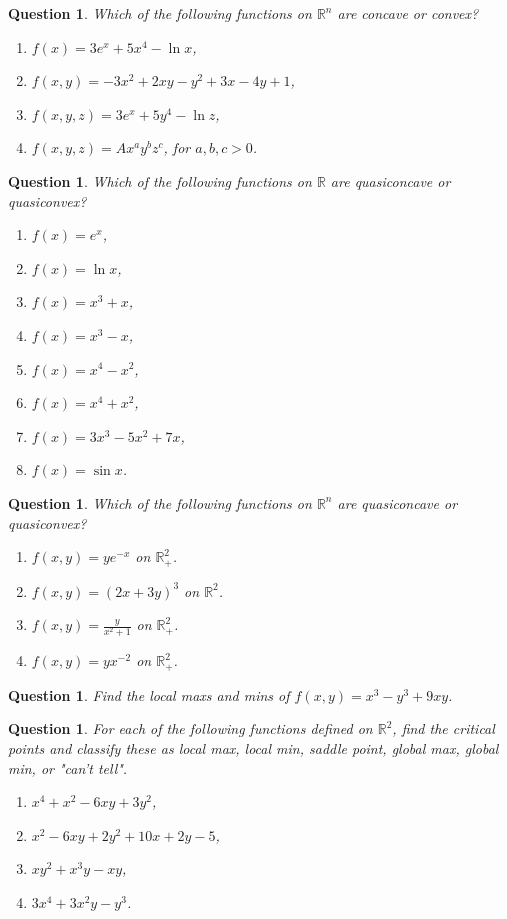 \documentclass[12pt]{article}
\newtheorem{ques}[theorem]{Question}
\begin{document}
\newpage
\begin{ques}
Which of the following functions on $\mathbb{R}^n$ are concave or convex?
\begin{enumerate}
    \item $f(x)=3e^x+5x^4-\ln x$,
    \item $f(x,y)=-3x^2+2xy-y^2+3x-4y+1$,
    \item $f(x,y,z)=3e^x+5y^4-\ln z$,
    \item $f(x,y,z)=Ax^ay^bz^c$, for $a,b,c>0$.
\end{enumerate}
\end{ques}


\newpage
\begin{ques}
Which of the following functions on $\mathbb{R}$ are quasiconcave or quasiconvex?
\begin{enumerate}
    \item $f(x)=e^x$,
    \item $f(x)=\ln x$,
    \item $f(x)=x^3+x$,
    \item $f(x)=x^3-x$,
    \item $f(x)=x^4-x^2$,
    \item $f(x)=x^4+x^2$,
    \item $f(x)=3x^3-5x^2+7x$,
    \item $f(x)=\sin x$.
\end{enumerate}

\end{ques}

\newpage
\begin{ques}
Which of the following functions on $\mathbb{R}^n$ are quasiconcave or quasiconvex?
\begin{enumerate}
    \item $f(x,y)=ye^{-x}$ on $\mathbb{R}_+^2$.
    \item $f(x,y)=(2x+3y)^3$ on $\mathbb{R}^2$.
    \item $f(x,y)=\frac{y}{x^2+1}$ on $\mathbb{R}_+^2$.
    \item $f(x,y)=yx^{-2}$ on $\mathbb{R}_+^2$.
\end{enumerate}
\end{ques}


\newpage
\begin{ques}
Find the local maxs and mins of $f(x,y)=x^3-y^3+9xy$.
\end{ques}

\newpage
\begin{ques}
For each of the following functions defined on $\mathbb{R}^2$, find the critical points and classify these as local max, local min, saddle point, global max, global min, or "can't tell".
\begin{enumerate}
    \item $x^4+x^2-6xy+3y^2$,
    \item $x^2-6xy+2y^2+10x+2y-5$,
    \item $xy^2+x^3y-xy$,
    \item $3x^4+3x^2y-y^3$.
    
\end{enumerate}
\end{ques}
\end{document}
